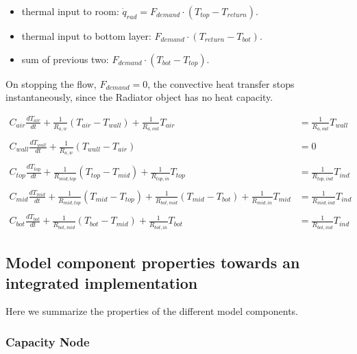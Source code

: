 \begin{itemize}
	\item thermal input to room: $\dot{q}_{rad} = F_{demand} \cdot (T_{top} - T_{return})$.
	\item thermal input to bottom layer: $F_{demand} \cdot (T_{return} - T_{bot})$.
	\item sum of previous two: $F_{demand} \cdot (T_{bot} - T_{top})$.
\end{itemize}

On stopping the flow, $F_{demand} = 0 $, the convective heat transfer stops instantaneously, since the \textsf{Radiator} object has no heat capacity.

	\begin{equation}
		\begin{aligned}
			C_{air}\frac{dT_{air}}{dt} + \frac{1}{R_{a,w}} (T_{air}-T_{wall}) + \frac{1}{R_{a,out}} T_{air} &= \frac{1}{R_{a,out}} T_{wall} \\ \\
			C_{wall}\frac{dT_{wall}}{dt} + \frac{1}{R_{a,w}} (T_{wall}-T_{air}) &= 0 \\ \\			
			C_{top}\frac{dT_{top}}{dt} + \frac{1}{R_{mid, top}} (T_{top}-T_{mid}) + \frac{1}{R_{top, in}} T_{top} &= \frac{1}{R_{top, ind}} T_{ind}
			\\ \\
			C_{mid}\frac{dT_{mid}}{dt} + \frac{1}{R_{mid, top}} (T_{mid} - T_{top}) + \frac{1}{R_{bot, mid}}(T_{mid}-T_{bot}) + \frac{1}{R_{mid, in}} T_{mid} &= \frac{1}{R_{mid, ind}} T_{ind} \\ \\ 
			C_{bot}\frac{dT_{bot}}{dt} + \frac{1}{R_{bot, mid}} (T_{bot} - T_{mid}) + \frac{1}{R_{bot, in}} T_{bot} &= \frac{1}{R_{bot, ind}} T_{ind} 
		\end{aligned}
	\end{equation}

\subsection{Model component properties towards an integrated implementation}
Here we summarize the properties of the different model components. 

\subsubsection{Capacity Node} \label{sec:capnode}

